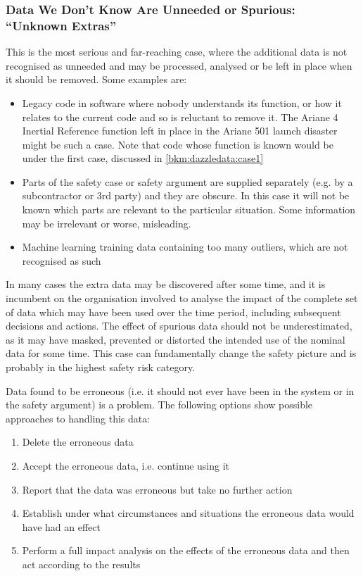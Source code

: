 \subsubsection{Data We Don’t Know Are Unneeded or Spurious: ``Unknown Extras''}
This is the most serious and far-reaching case, where the additional data is not recognised as unneeded and may be processed, analysed or be left in place when it should be removed. Some examples are:
\begin{itemize}
\item Legacy code in software where nobody understands its function, or how it relates to the current code and so is reluctant to remove it. The Ariane 4 Inertial Reference function left in place in the Ariane 501 launch disaster might be such a case. Note that code whose function is known would be under the first case, discussed in \ref{bkm:dazzledata:case1}
    \item Parts of the safety case or safety argument are supplied separately (e.g. by a subcontractor or 3rd party) and they are obscure. In this case it will not be known which parts are relevant to the particular situation. Some \gls{information} may be irrelevant or worse, misleading.
    \item Machine learning training data containing too many outliers, which are not recognised as such
\end{itemize}

In many cases the extra data may be discovered after some time, and it is incumbent on the organisation involved to analyse the impact of the complete set of data which may have been used over the time period, including subsequent decisions and actions. The effect of spurious data should not be underestimated, as it may have masked, prevented or distorted the intended use of the nominal data for some time. This case can fundamentally change the safety picture and is probably in the highest safety risk category.

Data found to be erroneous (i.e. it should not ever have been in the system or in the safety argument) is a problem. The following options show possible approaches to handling this data:
\begin{enumerate}[label=\color{dsiwgAccentColour}\roman*)]
    \item Delete the erroneous data
    \item Accept the erroneous data, i.e. continue using it
    \item Report that the data was erroneous but take no further action 
    \item Establish under what circumstances and situations the erroneous data would have had an effect
    \item Perform a full impact analysis on the effects of the erroneous data and then act according to the results
\end{enumerate}

